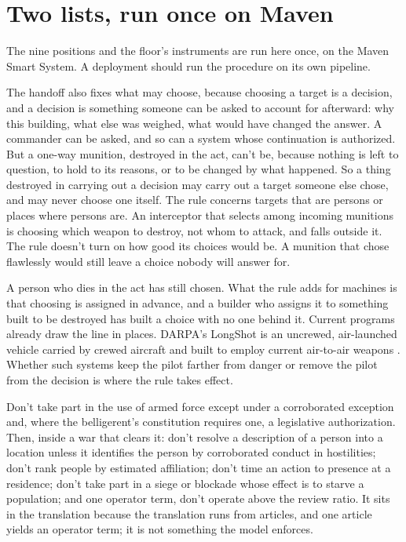 \section{Two lists, run once on Maven}
\label{sec:18.3}
The nine positions and the floor's instruments are run here once, on the Maven Smart System. A deployment should run the procedure on its own pipeline.


The handoff also fixes what may choose, because choosing a target is a decision, and a decision is something someone can be asked to account for afterward: why this building, what else was weighed, what would have changed the answer. A commander can be asked, and so can a system whose continuation is authorized. But a one-way munition, destroyed in the act, can't be, because nothing is left to question, to hold to its reasons, or to be changed by what happened. So a thing destroyed in carrying out a decision may carry out a target someone else chose, and may never choose one itself. The rule concerns targets that are persons or places where persons are. An interceptor that selects among incoming munitions is choosing which weapon to destroy, not whom to attack, and falls outside it. The rule doesn't turn on how good its choices would be. A munition that chose flawlessly would still leave a choice nobody will answer for.

A person who dies in the act has still chosen. What the rule adds for machines is that choosing is assigned in advance, and a builder who assigns it to something built to be destroyed has built a choice with no one behind it. Current programs already draw the line in places. DARPA's LongShot is an uncrewed, air-launched vehicle carried by crewed aircraft and built to employ current air-to-air weapons \autocite{darpa2026longshot,darpa2026longshotb}. Whether such systems keep the pilot farther from danger or remove the pilot from the decision is where the rule takes effect.


Don't take part in the use of armed force except under a corroborated exception and, where the belligerent's constitution requires one, a legislative authorization. Then, inside a war that clears it: don't resolve a description of a person into a location unless it identifies the person by corroborated conduct in hostilities; don't rank people by estimated affiliation; don't time an action to presence at a residence; don't take part in a siege or blockade whose effect is to starve a population; and one operator term, don't operate above the review ratio. It sits in the translation because the translation runs from articles, and one article yields an operator term; it is not something the model enforces.

